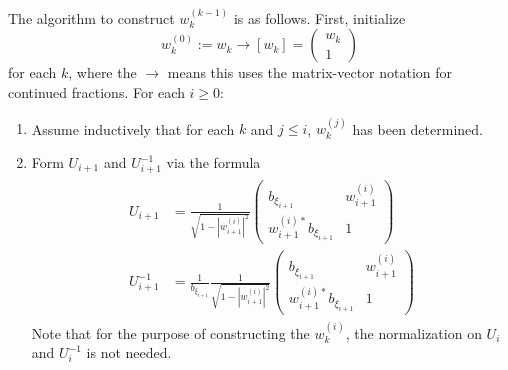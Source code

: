The algorithm to construct $w_k^{(k-1)}$ is as follows. First, initialize \begin{equation}
    w_k^{(0)} := w_k \rightarrow [w_k] = \begin{pmatrix} w_k \\ 1 \end{pmatrix}
\end{equation} 
for each $k$, where the $\rightarrow$ means this uses the matrix-vector notation for continued fractions. For each $i \geq 0$:
\begin{enumerate}
    \item Assume inductively that for each $k$ and $j\leq i$, $w_k^{(j)}$ has been determined.
    \item Form $U_{i+1}$ and $U_{i+1}^{-1}$ via the formula
    \begin{align}\begin{split}
        U_{i+1} &= \frac{1}{\sqrt{1 - |w_{i+1}^{(i)}|^2}} \begin{pmatrix}
            b_{\xi_{i+1}} & w_{i+1}^{(i)}  \\ 
            w_{i+1}^{(i)*}b_{\xi_{i+1}} & 1
        \end{pmatrix}
        \\
        U_{i+1}^{-1} &= \frac{1}{b_{\xi_{i+1}}} \frac{1}{\sqrt{1 - |w_{i+1}^{(i)}|^2}} 
 \begin{pmatrix}
            b_{\xi_{i+1}} & w_{i+1}^{(i)}  \\ 
            w_{i+1}^{(i)*}b_{\xi_{i+1}} & 1
        \end{pmatrix}
    \end{split}\end{align}
    Note that for the purpose of constructing the $w_k^{(i)}$, the normalization on $U_i$ and $U_i^{-1}$ is not needed. 
    

\end{enumerate}

